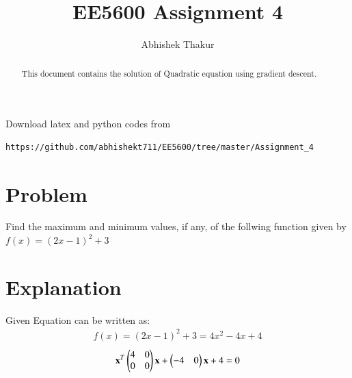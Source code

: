 \documentclass[journal,12pt,twocolumn]{IEEEtran}
\begin{document}
     \def\rightbox#1{\makebox[0in][r]{#1}}
     \def\centbox#1{\makebox[0in]{#1}}
     \def\topbox#1{\raisebox{-\baselineskip}[0in][0in]{#1}}
     \def\midbox#1{\raisebox{-0.5\baselineskip}[0in][0in]{#1}}
\vspace{3cm}
\title{EE5600 Assignment 4}
\author{Abhishek Thakur}
\maketitle
\newpage
\bigskip
\renewcommand{\thefigure}{\theenumi}
\renewcommand{\thetable}{\theenumi}
\newcommand\hlight[1]{\tikz[overlay, remember picture,baseline=-\the\dimexpr\fontdimen22\textfont2\relax]\node[rectangle,fill=blue!50,rounded corners,fill opacity = 0.2,draw,thick,text opacity =1] {$#1$};}
\begin{abstract}
This document contains the solution of Quadratic equation using gradient descent.
\end{abstract}
Download latex and python codes from 
\begin{lstlisting}
https://github.com/abhishekt711/EE5600/tree/master/Assignment_4
\end{lstlisting}
%
\section{Problem}
Find the maximum and minimum values, if any, of the follwing function given by\\
    $f(x)=(2x-1)^2+3$
\section{Explanation}
Given Equation can be written as:
\begin{align}
    f(x)=(2x-1)^2+3=4x^2-4x+4
\end{align}
\begin{align}
	\mathbf{x}^T\begin{pmatrix}4&0\\0&0\end{pmatrix}\mathbf{x}  + \begin{pmatrix}-4&0\end{pmatrix}\mathbf{x} +4 = 0
\end{align}
\end{document}

